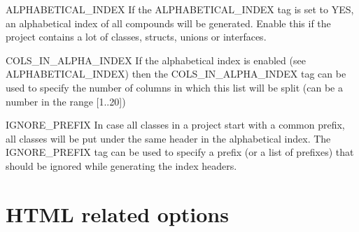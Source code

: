 \begin{DoxyDescription}
\item[{\ttfamily ALPHABETICAL\_\-INDEX} ] If the {\ttfamily ALPHABETICAL\_\-INDEX} tag is set to {\ttfamily YES}, an alphabetical index of all compounds will be generated. Enable this if the project contains a lot of classes, structs, unions or interfaces.


\item[{\ttfamily COLS\_\-IN\_\-ALPHA\_\-INDEX} ]\label{config_cfg_cols_in_alpha_index}
\hypertarget{config_cfg_cols_in_alpha_index}{}
  If the alphabetical index is enabled (see {\ttfamily ALPHABETICAL\_\-INDEX}) then the {\ttfamily COLS\_\-IN\_\-ALPHA\_\-INDEX} tag can be used to specify the number of columns in which this list will be split (can be a number in the range \mbox{[}1..20\mbox{]})

\label{config_cfg_ignore_prefix}
\hypertarget{config_cfg_ignore_prefix}{}
 
\item[{\ttfamily IGNORE\_\-PREFIX} ] In case all classes in a project start with a common prefix, all classes will be put under the same header in the alphabetical index. The {\ttfamily IGNORE\_\-PREFIX} tag can be used to specify a prefix (or a list of prefixes) that should be ignored while generating the index headers.


\end{DoxyDescription}\hypertarget{config_html_output}{}\section{HTML related options}\label{config_html_output}
\label{config_cfg_generate_html}
\hypertarget{config_cfg_generate_html}{}
 
